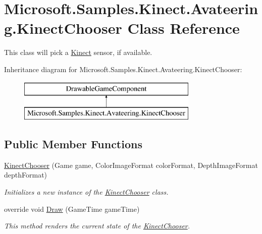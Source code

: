\hypertarget{class_microsoft_1_1_samples_1_1_kinect_1_1_avateering_1_1_kinect_chooser}{\section{Microsoft.\+Samples.\+Kinect.\+Avateering.\+Kinect\+Chooser Class Reference}
\label{class_microsoft_1_1_samples_1_1_kinect_1_1_avateering_1_1_kinect_chooser}
}


This class will pick a \hyperlink{namespace_microsoft_1_1_samples_1_1_kinect}{Kinect} sensor, if available.  


Inheritance diagram for Microsoft.\+Samples.\+Kinect.\+Avateering.\+Kinect\+Chooser\+:\begin{figure}[H]
\begin{center}
\leavevmode
\includegraphics[height=2.000000cm]{class_microsoft_1_1_samples_1_1_kinect_1_1_avateering_1_1_kinect_chooser}
\end{center}
\end{figure}
\subsection*{Public Member Functions}
\begin{DoxyCompactItemize}
\item 
\hyperlink{class_microsoft_1_1_samples_1_1_kinect_1_1_avateering_1_1_kinect_chooser_a29881c15d2fce5627afaf44aedebb167}{Kinect\+Chooser} (Game game, Color\+Image\+Format color\+Format, Depth\+Image\+Format depth\+Format)
\begin{DoxyCompactList}\small\item\em Initializes a new instance of the \hyperlink{class_microsoft_1_1_samples_1_1_kinect_1_1_avateering_1_1_kinect_chooser}{Kinect\+Chooser} class. \end{DoxyCompactList}\item 
override void \hyperlink{class_microsoft_1_1_samples_1_1_kinect_1_1_avateering_1_1_kinect_chooser_a2a64601325b25988ed098dffbe304b85}{Draw} (Game\+Time game\+Time)
\begin{DoxyCompactList}\small\item\em This method renders the current state of the \hyperlink{class_microsoft_1_1_samples_1_1_kinect_1_1_avateering_1_1_kinect_chooser}{Kinect\+Chooser}. \end{DoxyCompactList}\end{DoxyCompactItemize}
